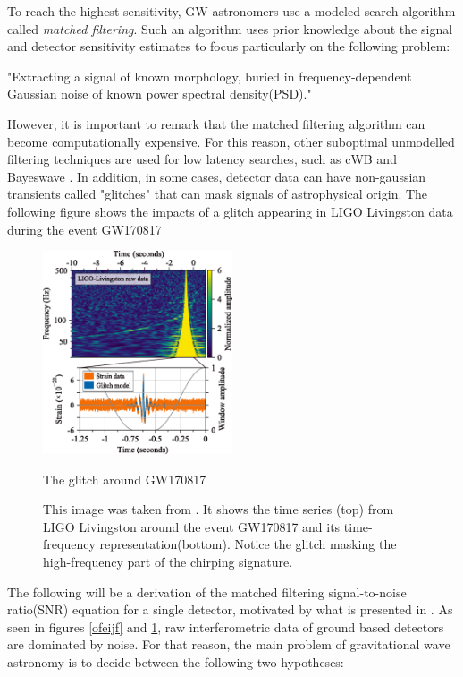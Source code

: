 To reach the highest sensitivity, GW astronomers use a modeled search algorithm called \textit{matched filtering}. Such an algorithm uses prior knowledge about the signal and detector sensitivity estimates to focus particularly on the following problem:

"Extracting a signal of known morphology, buried in frequency-dependent Gaussian noise of known power spectral density(PSD)."

However, it is important to remark that the matched filtering algorithm can become computationally expensive. For this reason, other suboptimal unmodelled filtering techniques are used for low latency searches, such as cWB and Bayeswave \cite{Drago:2020kic, Cornish:2014kda}. In addition, in some cases, detector data can have non-gaussian transients called "glitches" that can mask signals of astrophysical origin. The following figure shows the impacts of a glitch appearing in LIGO Livingston data during the event GW170817
 

\begin{figure}[hbt!]
\begin{center}
\includegraphics[width=0.5\textwidth, angle=0]{images/170817.png}
\captionsetup{width=0.8\textwidth}
\caption{The glitch around GW170817}
\caption*{This image was taken from \cite{LIGOScientific:2017vwq}. It shows the time series (top) from LIGO Livingston around the event GW170817 and its time-frequency representation(bottom). Notice the glitch masking the high-frequency part of the chirping signature.}
\label{ijenfo}
\end{center}
\end{figure}

\FloatBarrier

The following will be a derivation of the matched filtering signal-to-noise ratio(SNR) equation for a single detector, motivated by what is presented in \cite{Sathyaprakash:2009xs,Creighton:2011zz,Maggiore:2007ulw,Saulson:1995zi}. As seen in figures \ref{ofeijf} and \ref{ijenfo}, raw interferometric data of ground based detectors are dominated by noise. For that reason, the main problem of gravitational wave astronomy is to decide between the following two hypotheses:

